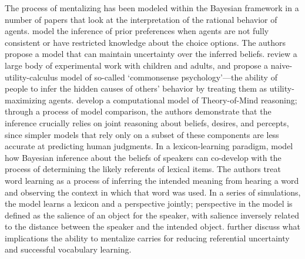 \documentclass[11pt,a4paper]{article}
\begin{document}
The process of mentalizing has been modeled within the Bayesian framework in a number of papers that look at the interpretation of the rational behavior of agents. 
 model the inference of prior preferences when agents are not fully consistent or have restricted knowledge about the choice options. The authors propose a model that can maintain uncertainty over the inferred beliefs. %
 review a large body of experimental work with children and adults, and propose a naive-utility-calculus model of so-called `commonsense psychology'---the ability of people to infer the hidden causes of others' behavior by treating them as utility-maximizing agents. 
 develop a computational model of Theory-of-Mind reasoning; %
through a process of model comparison, the authors demonstrate that the inference crucially relies on joint reasoning about beliefs, desires, and percepts, since simpler models that rely only on a subset of these components are less accurate at predicting human judgments.
In a lexicon-learning paradigm,  model how Bayesian inference about the beliefs of speakers can co-develop with the process of determining the likely referents of lexical items. The authors treat word learning as a process of inferring the intended meaning from hearing a word and observing the context in which that word was used. In a series of simulations, the model learns a lexicon and a perspective jointly; perspective in the model is defined as the salience of an object for the speaker, with salience inversely related to the distance between the speaker and the intended object. 
\citeauthor{woensdregt2016modelling} further discuss what implications the ability to mentalize carries for reducing referential uncertainty and successful vocabulary learning.
\end{document}
